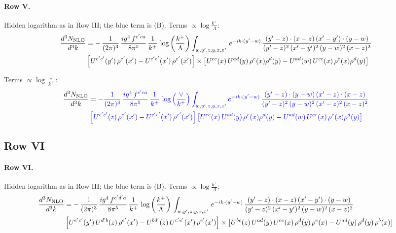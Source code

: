 \documentclass[10pt]{article}
\numberwithin{equation}{section}
\newcommand{\new}[1]{{\color{blue}#1}}
\newcommand{\nc}{\color{blue}}
\begin{document}
\paragraph{Row V.}
Hidden logarithm as in Row III; the \new{blue} term is (B).
\noindent Terms $\propto\log\frac{k^+}{\Lambda}$:
\begin{align}
    \frac{d^{3}N_{\rm NLO}}{d^{3}k} & =   -\,\frac{1}{(2\pi)^{3}}\, \frac{ig^{4}\,f^{c'ca}}{8\pi^{5}}\, \frac{1}{k^{+}}\,\log{\left(\frac{k^{+}}{\Lambda}\right)} \int_{w,y',z,y,x,x'}\, e^{-ik\cdot (y'-w)}\,\frac{(y'-z)\cdot (x-z)\,(x'-y')\cdot (y-w)}{(y'-z)^{2}\,(x'-y')^{2}\,(y-w)^{2}\,(x-z)^{2}}\notag \\ & \left[U^{e'c'}(y')\,\rho^{e'}(x')-U^{c'e'}(x')\,\rho^{e'}(x')\right]\times  \left[U^{ce}(x)\,U^{ad}(y)\,\rho^{e}(x)\rho^{d}(y)-U^{ad}(w)\,U^{ce}(x)\,\rho^{e}(x)\rho^{d}(y)\right] \label{eq:J:G3V}
\end{align}

\noindent Terms $\propto\log\frac{\vee}{k^+}$:
\begin{align}
    \frac{d^{3}N_{\rm NLO}}{d^{3}k} & =  \nc -\frac{1}{(2\pi)^{3}}\, \frac{ig^{4}\,f^{c'ca}}{8\pi^{5}}\, \frac{1}{k^{+}}\,\log{\left(\frac{\vee}{k^{+}}\right)}\int_{w,y',z,y,x,x'} e^{-ik\cdot (y'-w)}\,\frac{(y'-z)\cdot (y-w)\,(x'-z)\cdot (x-z)}{(y'-z)^{2}\,(y-w)^{2}\,(x'-z)^{2}\,(x-z)^{2}}\notag \\
& \nc  \left[U^{e'c'}(z)\,\rho^{e'}(x')-U^{c'e'}(x')\,\rho^{e'}(x')\right]\left[U^{ce}(x)\,U^{ad}(y)\,\rho^{e}(x)\rho^{d}(y)-U^{ad}(w)\,U^{ce}(x)\,\rho^{e}(x)\rho^{d}(y)\right] \label{eq:B:G3V}
\end{align}

\subsection{Row VI}
\paragraph{Row VI.}
Hidden logarithm as in Row III; the \new{blue} term is (B).
\noindent Terms $\propto\log\frac{k^+}{\Lambda}$:
\begin{align}
    \frac{d^{3}N_{\rm NLO}}{d^{3}k} & =    -\,\frac{1}{(2\pi)^{3}}\, \frac{ig^{4}\,f^{c'd'a}}{8\pi^{5}}\, \frac{1}{k^{+}}\,\log{\left(\frac{k^{+}}{\Lambda}\right)}\, \int_{w,y',z,y,x,x'}\, e^{-ik\cdot (y'-w)}\,\frac{(y'-z)\cdot (x-z)\,(x'-y')\cdot (y-w)}{(y'-z)^{2}\,(x'-y')^{2}\,(y-w)^{2}\,(x-z)^{2}}\notag \\ & \left[U^{e'c'}(y')\,U^{d'b}(z)\,\rho^{e'}(x')-U^{bd'}(z)\,U^{c'e'}(x')\,\rho^{e'}(x')\right]\times  \left[U^{bc}(z)\,U^{ad}(y)\,U^{ce}(x)\,\rho^{d}(y)\,\rho^{e}(x)-U^{ad}(y)\,\rho^{d}(y)\,\rho^{b}(x)\right] \label{eq:J:G3VI}
\end{align}
\end{document}
